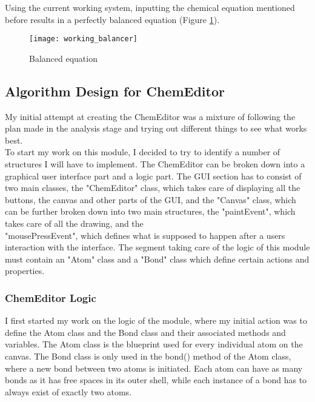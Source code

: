 \documentclass[a4paper,12pt]{article}
\begin{document}
Using the current working system, inputting the chemical equation mentioned before results in a perfectly balanced equation (Figure \ref{fig:working_balancer}).

\begin{figure} [h]
	\centering
	\texttt{[image: working\_balancer]}
	\caption{Balanced equation}
	\label{fig:working_balancer}
\end{figure}

\newpage

\subsection{Algorithm Design for ChemEditor}

My initial attempt at creating the ChemEditor was a mixture of following the plan made in the analysis stage and trying out different things to see what works best.\\
\linebreak
To start my work on this module, I decided to try to identify a number of structures I will have to implement. The ChemEditor can be broken down into a graphical user interface part and a logic part. The GUI section has to consist of two main classes, the "ChemEditor" class, which takes care of displaying all the buttons, the canvas and other parts of the GUI, and the "Canvas" class, which can be further broken down into two main structures, the "paintEvent", which takes care of all the drawing, and the\\ "mousePressEvent", which defines what is supposed to happen after a users interaction with the interface. The segment taking care of the logic of this module must contain an "Atom" class and a "Bond" class which define certain actions and properties.\\

\subsubsection{ChemEditor Logic}

I first started my work on the logic of the module, where my initial action was to define the Atom class and the Bond class and their associated methods and variables. The Atom class is the blueprint used for every individual atom on the canvas. The Bond class is only used in the bond() method of the Atom class, where a new bond between two atoms is initiated. Each atom can have as many bonds as it has free spaces in its outer shell, while each instance of a bond has to always exist of exactly two atoms.
\end{document}
